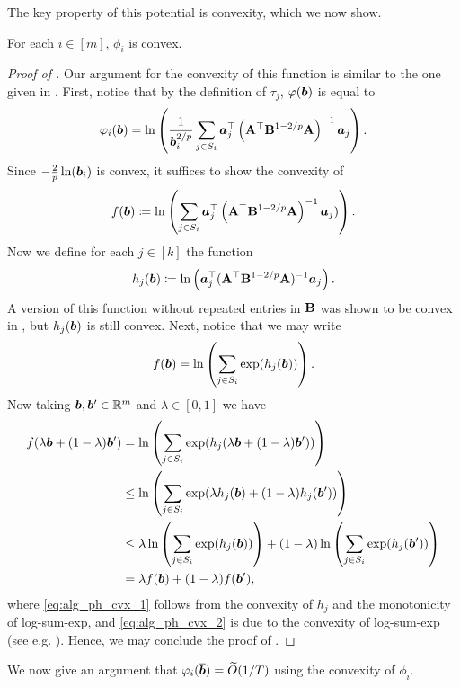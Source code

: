 \documentclass[11pt]{article}
\numberwithin{equation}{section}
\begin{document}
The key property of this potential is convexity, which we now show.
\begin{lemma}
\label{lemma:alg_phi_convex}
    For each \(i \in [m]\), \(\phi_i\) is convex.
\end{lemma}
\begin{proof}[Proof of ]
     Our argument for the convexity of this function is similar to the one given in \cite[Lemma A.2]{jls21}.
     First, notice that by the definition of \(\tau_j\), \(\varphi(\bm{b})\) is equal to
     \begin{align*}
         \varphi_i(\bm{b}) = \ln\left(\frac{1}{\bm{b}_i^{2/p}} \sum_{j \in S_i} \bm{a}_j^\top \left(\mathbf{A}^\top \mathbf{B}^{1 - 2/p} \mathbf{A}\right)^{-1} \bm{a}_j\right).
     \end{align*}
     Since \(- \frac{2}{p} \ln(\bm{b}_i)\) is convex, it suffices to show the convexity of
     \[f(\bm{b}) \coloneqq \ln\left(\sum_{j \in S_i} \bm{a}_j^\top \left(\mathbf{A}^\top \mathbf{B}^{1 - 2/p} \mathbf{A}\right)^{-1} \bm{a}_j)\right).\]
     Now we define for each \(j \in [k]\) the function
     \[h_j(\bm{b}) \coloneqq \ln \left(\bm{a}_j^\top (\mathbf{A}^\top \mathbf{B}^{1-2/p} \mathbf{A})^{-1} \bm{a}_j\right).\]
     A version of this function without repeated entries in \(\mathbf{B}\) was shown to be convex in \cite[Lemma A.2]{jls21}, but \(h_j(\bm{b})\) is still convex.
     Next, notice that we may write \[
     f(\bm{b}) = \ln\left(\sum_{j \in S_i} \exp(h_j(\bm{b}))\right).
     \]
     Now taking \(\bm{b}, \bm{b}' \in \mathbb{R}^m\) and \(\lambda \in [0, 1]\) we have
     \begin{align}
        f(\lambda \bm{b} + (1-\lambda) \bm{b}') &= \ln\left(\sum_{j \in S_i} \exp(h_j(\lambda \bm{b} + (1-\lambda) \bm{b}'))\right) \nonumber
        \\
     &\le \ln\left(\sum_{j \in S_i} \exp(\lambda h_j(\bm{b}) + (1-\lambda) h_j(\bm{b}'))\right) \label{eq:alg_ph_cvx_1}\\
     &\le \lambda \ln\left(\sum_{j \in S_i} \exp(h_j(\bm{b}))\right) + (1-\lambda) \ln\left(\sum_{j \in S_i} \exp(h_j(\bm{b}'))\right) \label{eq:alg_ph_cvx_2} \\
     &= \lambda f(\bm{b}) + (1-\lambda) f(\bm{b}'), \nonumber
     \end{align}
     where \eqref{eq:alg_ph_cvx_1} follows from the convexity of \(h_j\) and the monotonicity of log-sum-exp, and \eqref{eq:alg_ph_cvx_2} is due to the convexity of log-sum-exp (see e.g. \cite[Section 3.1.5]{boyd2004convex}). Hence, we may conclude the proof of .
\end{proof}

We now give an argument that \(\varphi_i(\overline{\bm{b}}) = \widetilde{O}(1/T)\) using the convexity of \(\phi_i\).
\end{document}
